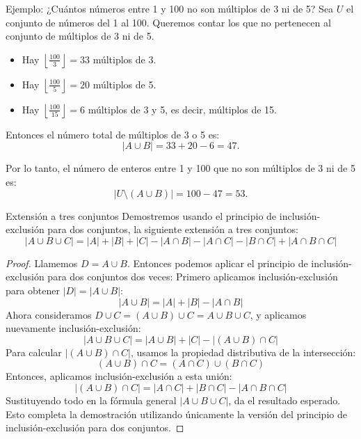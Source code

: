 \begin{exampleblock}{Ejemplo: ¿Cuántos números entre 1 y 100 no son múltiplos de 3 ni de 5?}
Sea $U$ el conjunto de números del 1 al 100. Queremos contar los que no pertenecen al conjunto de múltiplos de 3 ni de 5.

\begin{itemize}
  \item Hay $\left\lfloor \frac{100}{3} \right\rfloor = 33$ múltiplos de 3.
  \item Hay $\left\lfloor \frac{100}{5} \right\rfloor = 20$ múltiplos de 5.
  \item Hay $\left\lfloor \frac{100}{15} \right\rfloor = 6$ múltiplos de 3 y 5, es decir, múltiplos de 15.
\end{itemize}

Entonces el número total de múltiplos de 3 o 5 es:
\[
|A \cup B| = 33 + 20 - 6 = 47.
\]

Por lo tanto, el número de enteros entre 1 y 100 que no son múltiplos de 3 ni de 5 es:
\[
|U \setminus (A \cup B)| = 100 - 47 = 53.
\]
\end{exampleblock}


\begin{exampleblock}{Extensión a tres conjuntos}
Demostremos usando el principio de inclusión-exclusión para dos conjuntos, la siguiente extensión a tres conjuntos: 
\[
|A \cup B \cup C| = |A| + |B| + |C| - |A \cap B| - |A \cap C| - |B \cap C| + |A \cap B \cap C|
\]
\end{exampleblock}


\begin{proof}

Llamemos $D = A \cup B$. Entonces podemos aplicar el principio de inclusión-exclusión para dos conjuntos dos veces:
Primero aplicamos inclusión-exclusión para obtener $|D| = |A \cup B|$:
\[
|A \cup B| = |A| + |B| - |A \cap B|
\]
Ahora consideramos $D \cup C = (A \cup B) \cup C = A \cup B \cup C$, y aplicamos nuevamente inclusión-exclusión:
\[
|A \cup B \cup C| = |A \cup B| + |C| - |(A \cup B) \cap C|
\]
Para calcular $|(A \cup B) \cap C|$, usamos la propiedad distributiva de la intersección:
\[
(A \cup B) \cap C = (A \cap C) \cup (B \cap C)
\]
Entonces, aplicamos inclusión-exclusión a esta unión:
\[
|(A \cup B) \cap C| = |A \cap C| + |B \cap C| - |A \cap B \cap C|
\]
Sustituyendo todo en la fórmula general $|A \cup B \cup C|$, da el resultado esperado.
Esto completa la demostración utilizando únicamente la versión del principio de inclusión-exclusión para dos conjuntos.
\end{proof}

